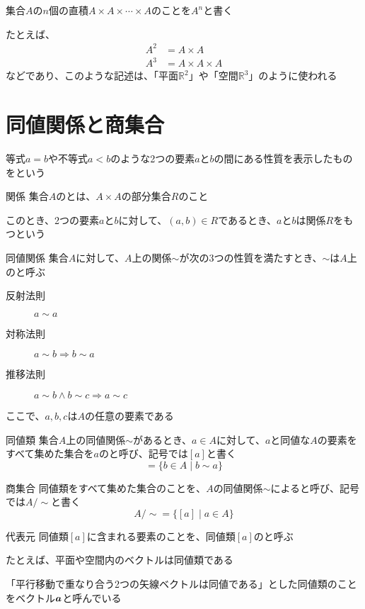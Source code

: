 \documentclass[b5paper,12pt]{jsarticle}
\begin{document}
\sectionline

集合$A$の$n$個の直積$A \times A \times \cdots \times A$のことを$A^n$と書く

たとえば、
\begin{align*}
  A^2 & = A \times A          \\
  A^3 & = A \times A \times A
\end{align*}
などであり、このような記述は、「平面$\mathbb{R}^2$」や「空間$\mathbb{R}^3$」のように使われる

\sectionline
\section{同値関係と商集合}

等式$a=b$や不等式$a < b$のような2つの要素$a$と$b$の間にある性質を表示したものをという

\begin{definition}{関係}
  集合$A$のとは、$A \times A$の部分集合$R$のこと

  このとき、2つの要素$a$と$b$に対して、$(a, b) \in R$であるとき、$a$と$b$は関係$R$をもつという
\end{definition}

\begin{definition}{同値関係}
  集合$A$に対して、$A$上の関係$\sim $が次の3つの性質を満たすとき、$\sim$は$A$上のと呼ぶ
  \begin{description}
    \item[反射法則] $a \sim a$
    \item[対称法則] $a \sim b \Rightarrow b \sim a$
    \item[推移法則] $a \sim b \land b \sim c \Rightarrow a \sim c$
  \end{description}
  ここで、$a, b, c$は$A$の任意の要素である
\end{definition}

\begin{definition}{同値類}
  集合$A$上の同値関係$\sim$があるとき、$a \in A$に対して、$a$と同値な$A$の要素をすべて集めた集合を$a$のと呼び、記号では$[a]$と書く
  \begin{equation*}
    [a] = \{b \in A \mid b \sim a\}
  \end{equation*}
\end{definition}

\begin{definition}{商集合}
  同値類をすべて集めた集合のことを、$A$の同値関係$\sim$によると呼び、記号では$A/\sim $と書く
  \begin{equation*}
    A/\sim = \{[a] \mid a \in A\}
  \end{equation*}
\end{definition}

\begin{definition}{代表元}
  同値類$[a]$に含まれる要素のことを、同値類$[a]$のと呼ぶ
\end{definition}

たとえば、平面や空間内のベクトルは同値類である

「平行移動で重なり合う2つの矢線ベクトルは同値である」とした同値類のことをベクトル$\vb*{a}$と呼んでいる
\end{document}
